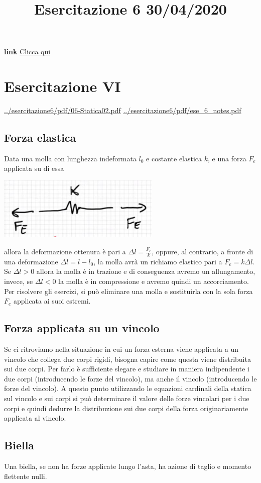 \title{Esercitazione 6 30/04/2020}\newline
\textbf{link} \href{https://web.microsoftstream.com/video/e7731d3b-34c1-4fd2-a49a-606e7413fb96}{Clicca qui}
\section{Esercitazione VI}
\url{../esercitazione6/pdf/06-Statica02.pdf}\newline
\url{../esercitazione6/pdf/ese_6_notes.pdf}
\subsection{Forza elastica}
Data una molla con lunghezza indeformata $l_0$ e costante elastica $k$, e una forza $F_e$ applicata su di essa
\begin{center}
    \includegraphics[height=3cm]{../esercitazione6/img1.JPG}
\end{center}
allora la deformazione ottenura è pari a $\Delta l = \frac{F_e}{k}$, oppure, al contrario, a fronte di una deformazione $\Delta l = l - l_0$, la molla avrà un richiamo elastico pari a $F_e = k \Delta l$.\newline
\newline
Se $\Delta l > 0$ allora la molla è in trazione e di conseguenza avremo un allungamento, invece, se $\Delta l < 0$ la molla è in compressione e avremo quindi un accorciamento.\newline
\newline
Per risolvere gli esercizi, si può eliminare una molla e sostituirla con la sola forza $F_e$ applicata ai suoi estremi.
\subsection{Forza applicata su un vincolo}
Se ci ritroviamo nella situazione in cui un forza esterna viene applicata a un vincolo che collega due corpi rigidi, bisogna capire come questa viene distribuita sui due corpi.\newline
\newline
Per farlo è sufficiente slegare e studiare in maniera indipendente i due corpi (introducendo le forze del vincolo), ma anche il vincolo (introducendo le forze del vincolo). A questo punto utilizzando le equazioni cardinali della statica sul vincolo e sui corpi si può determinare il valore delle forze vincolari per i due corpi e quindi dedurre la distribuzione sui due corpi della forza originariamente applicata al vincolo.
\subsection{Biella}
Una biella, se non ha forze applicate lungo l'asta, ha azione di taglio e momento flettente nulli.